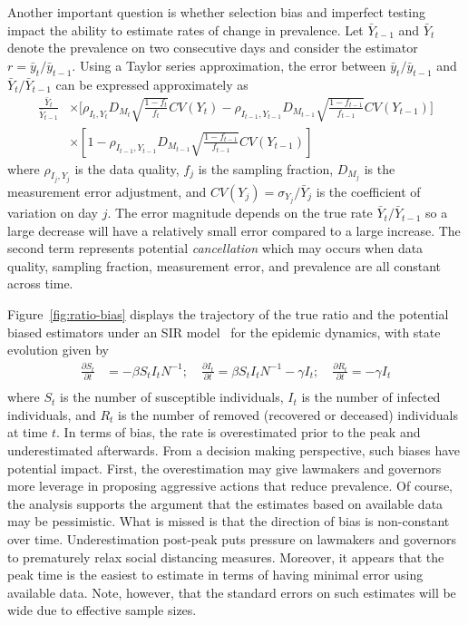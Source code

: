 \documentclass[12pt]{article}
\begin{document}
Another important question is whether selection bias and imperfect testing impact the ability to estimate rates of change in prevalence.  Let $\bar Y_{t-1}$ and $\bar Y_{t}$ denote the prevalence on two consecutive days and consider the estimator $r = \bar y_t / \bar y_{t-1}$.  Using a Taylor series approximation, the error between ${\bar y_t}/{\bar y_{t-1}}$ and ${\bar Y_{t}}/{\bar Y_{t-1}}$ can be expressed approximately as
$$
\begin{aligned}
\frac{\bar Y_t}{\bar Y_{t-1}} &\times \bigg[ \rho_{I_t,Y_t} D_{M_t} \sqrt{\frac{1-f_t}{f_t}} CV (Y_t)  -\rho_{I_{t-1},Y_{t-1}} D_{M_{t-1}} \sqrt{\frac{1-f_{t-1}}{f_{t-1}}} CV (Y_{t-1}) \bigg] \\
&\times \left[ 1 - \rho_{I_{t-1},Y_{t-1}} D_{M_{t-1}} \sqrt{\frac{1-f_{t-1}}{f_{t-1}}} CV (Y_{t-1}) \right]
\end{aligned}
$$
where $\rho_{I_j, Y_j}$ is the data quality, $f_j$ is the sampling fraction, $D_{M_j}$ is the measurement error adjustment, and $CV(Y_j) = \sigma_{Y_j}/\bar Y_j$ is the coefficient of variation on day $j$.  The error magnitude depends on the true rate $\bar Y_{t} / \bar Y_{t-1}$ so a large decrease will have a relatively small error compared to a large increase. The second term represents potential \emph{cancellation} which may occurs when data quality, sampling fraction, measurement error, and prevalence are all constant across time.

Figure~\ref{fig:ratio-bias} displays the trajectory of the true ratio and the potential biased estimators under an SIR model~\cite{Pastor2001,Newman2002,Parshani2010} for the epidemic dynamics, with state evolution given by
$$
\begin{aligned}
\frac{\partial S_t}{\partial t} &= - \beta S_t I_t N^{-1}; \quad
\frac{\partial I_t}{\partial t} = \beta S_t I_t N^{-1} - \gamma I_t; \quad
\frac{\partial R_t}{\partial t} = - \gamma I_t \\
\end{aligned}
$$
where $S_t$ is the number of susceptible individuals, $I_t$ is the number of infected individuals, and $R_t$ is the number of removed (recovered or deceased) individuals at time $t$.  In terms of bias, the rate is overestimated prior to the peak and underestimated afterwards.  From a decision making perspective, such biases have potential impact.  First, the overestimation may give lawmakers and governors more leverage in proposing aggressive actions that reduce prevalence.  Of course, the analysis supports the argument that the estimates based on available data may be pessimistic. What is missed is that the direction of bias is non-constant over time.   Underestimation post-peak puts pressure on lawmakers and governors to prematurely relax social distancing measures.  Moreover, it appears that the peak time is the easiest to estimate in terms of having minimal error using available data.  Note, however, that the standard errors on such estimates will be wide due to effective sample sizes.
\end{document}
